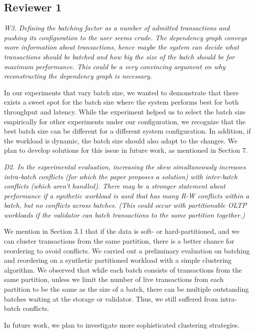 \documentclass{article}
\begin{document}
\subsection{Reviewer 1}

\emph{W3. Defining the batching factor as a number of admitted transactions and pushing its configuration to the user seems crude. The dependency graph conveys more information about transactions, hence maybe the system can decide what transactions should be batched and how big the size of the batch should be for maximum performance. This could be a very convincing argument on why reconstructing the dependency graph is necessary.}

In our experiments that vary batch size, we wanted to demonstrate that there exists a sweet spot for the batch size where the system performs best for both throughput and latency. While the experiment helped us to select the batch size empirically for other experiments under our configuration, we recognize that the best batch size can be different for a different system configuration. In addition, if the workload is dynamic, the batch size should also adapt to the changes. We plan to develop solutions for this issue in future work, as mentioned in Section 7.

\emph{D2. In the experimental evaluation, increasing the skew simultaneously increases intra-batch conflicts (for which the paper proposes a solution) with inter-batch conflicts (which aren't handled). There may be a stronger statement about performance if a synthetic workload is used that has many R-W conflicts within a batch, but no conflicts across batches. (This could occur with partitionable OLTP workloads if the validator can batch transactions to the same partition together.)}

We mention in Section 3.1 that if the data is soft- or hard-partitioned, and we can cluster transactions from the same partition, there is a better chance for reordering to avoid conflicts. We carried out a preliminary evaluation on batching and reordering on a synthetic partitioned workload with a simple clustering algorithm. We observed that while each batch consists of transactions from the same partition, unless we limit the number of live transactions from each partition to be the same as the size of a batch, there can be multiple outstanding batches waiting at the storage or validator. Thus, we still suffered from intra-batch conflicts. 

In future work, we plan to investigate more sophisticated clustering strategies.
\end{document}
